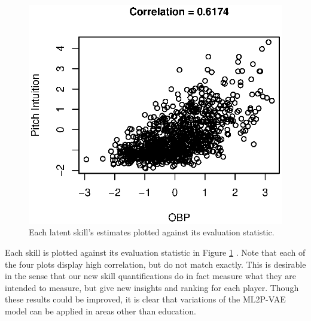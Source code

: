 \begin{figure}[h!]
\endminipage\hfill
{}
    \includegraphics[width=.85\textwidth]{img/fsdm_results/pitch_intuit_corr.eps}
\endminipage\hfill
\caption{Each latent skill's estimates plotted against its evaluation statistic.}
\label{fig:baseball}
\end{figure}

Each skill is plotted against its evaluation statistic in Figure \ref{fig:baseball} \cite{fsdm_paper}. Note that each of the four plots display high correlation, but do not match exactly. This is desirable in the sense that our new skill quantifications do in fact measure what they are intended to measure, but give new insights and ranking for each player. Though these results could be improved, it is clear that variations of the ML2P-VAE model can be applied in areas other than education.


